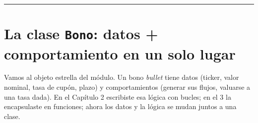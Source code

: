 \documentclass[
  spanish,
  letterpaper,
  DIV=11,
  numbers=noendperiod]{scrreprt}
\begin{document}
\begin{center}\rule{0.5\linewidth}{0.5pt}\end{center}

\section{\texorpdfstring{La clase \texttt{Bono}: datos + comportamiento
en un solo
lugar}{La clase Bono: datos + comportamiento en un solo lugar}}\label{la-clase-bono-datos-comportamiento-en-un-solo-lugar}

Vamos al objeto estrella del módulo. Un bono \emph{bullet} tiene datos
(ticker, valor nominal, tasa de cupón, plazo) y comportamientos (generar
sus flujos, valuarse a una tasa dada). En el Capítulo 2 escribiste esa
lógica con bucles; en el 3 la encapsulaste en funciones; ahora los datos
y la lógica se mudan juntos a una clase.
\end{document}

